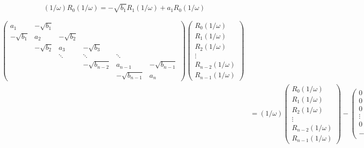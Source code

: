 \begin{equation}
  (1/\omega)R_0(1/\omega) = - \sqrt{b_1}R_1(1/\omega) + a_1 R_0(1/\omega)
\end{equation}

\begin{equation}
 \begin{split}
 \begin{pmatrix}
a_1        & -\sqrt{b_1}&            &                &             &          \\
-\sqrt{b_1}& a_2        & -\sqrt{b_2}&                &             &          \\
           & -\sqrt{b_2}& a_3        & -\sqrt{b_3}    &             &          \\
           &            & \ddots     & \ddots         & \ddots      &          \\
           &            &            & -\sqrt{b_{n-2}}& a_{n-1}     & -\sqrt{b_{n-1}}\\
           &            &            &                & -\sqrt{b_{n-1}}& a_n   
 \end{pmatrix}
 \begin{pmatrix}
  R_0(1/\omega)\\
  R_1(1/\omega)\\
  R_2(1/\omega)\\
  \vdots\\
  R_{n-2}(1/\omega)\\
  R_{n-1}(1/\omega)
 \end{pmatrix}         \\
 &= (1/\omega)
 \begin{pmatrix}
  R_0(1/\omega)\\
  R_1(1/\omega)\\
  R_2(1/\omega)\\
  \vdots\\
  R_{n-2}(1/\omega)\\
  R_{n-1}(1/\omega)
 \end{pmatrix}
 -
 \begin{pmatrix}
  0\\
  0\\
  0\\
  \vdots\\
  0\\
  -\sqrt{b_n} R_{n}(1/\omega)
 \end{pmatrix}
 \end{split}
\end{equation}



